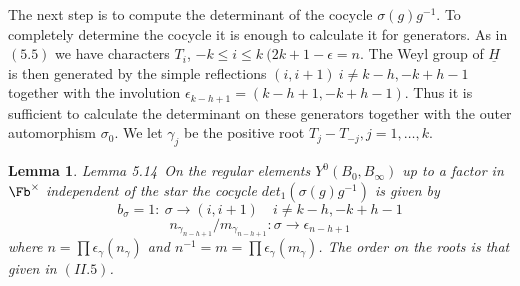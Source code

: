 \documentclass{memo-l}
\newtheorem{lemma}[theorem]{Lemma}
\theoremstyle{definition}
\theoremstyle{remark}
\numberwithin{section}{chapter}
\numberwithin{equation}{chapter}
\begin{document}
   The next step is to compute the determinant of the cocycle
${\sigma}(g)g^{-1}$.  To completely determine the cocycle it is enough to
calculate it for generators.  As in $(5.5)$ we have characters $T_{i}$,
$-k \le i \le k \ (2k+1-{\epsilon} = n$.  The Weyl group of $\underline{H}$ is then
generated by the simple reflections $(i,i+1)\  i \ne  k-h, -k+h-1$ together
with the involution ${\epsilon}_{k-h+1}  =  (k-h+1,-k+h-1)$.  Thus it is
sufficient to calculate the determinant on these generators together with
the outer automorphism ${\sigma}_{0}$.  We let ${\gamma}_{j}$ be the
positive root $T_{j}-T_{-j}, j = 1,\ldots ,k$.


\begin{lemma}{Lemma 5.14}\ On the regular elements
$Y^{0}(B_{0},B_{{\infty}})$ up to a factor in $\Fb ^{\times}$ independent of
the star the cocycle $det_{1}({\sigma}(g)g^{-1})$ is given by
$$
b_{{\sigma}}  =  1 : \ {\sigma} {\to} (i,i+1) \quad i \ne  k-h, -k+h-1
$$
$$
n_{{\gamma_{n-h+1}}} /m_{{\gamma_{n-h+1}}} : {\sigma} {\to}
{\epsilon}_{n-h+1}
$$
where $n  = \prod {\epsilon}_{{\gamma}}(n_{{\gamma}})$ and $n^{-1}  =  m  
= \prod{\epsilon}_{{\gamma}}(m_{{\gamma}})$.  The order
on the roots is that given in $(II.5)$.
\end{lemma}
\end{document}
